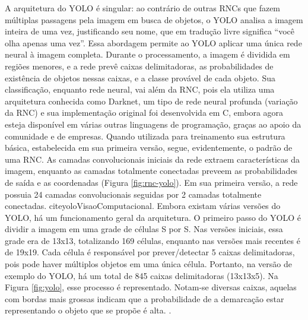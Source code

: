 A arquitetura do YOLO é singular: ao contrário de outras RNCs que fazem múltiplas passagens pela imagem em busca de objetos, o YOLO analisa a imagem inteira de uma vez, justificando seu nome, que em tradução livre significa “você olha apenas uma vez”. Essa abordagem permite ao YOLO aplicar uma única rede neural à imagem completa. Durante o processamento, a imagem é dividida em regiões menores, e a rede prevê caixas delimitadoras, as probabilidades de existência de objetos nessas caixas, e a classe provável de cada objeto. Sua classificação, enquanto rede neural, vai além da RNC, pois ela utiliza uma arquitetura conhecida como Darknet, um tipo de rede neural profunda (variação da RNC) e sua implementação original foi desenvolvida em C, embora agora esteja disponível em várias outras linguagens de programação, graças ao apoio da comunidade e de empresas. Quando utilizada para treinamento sua estrutura básica, estabelecida em sua primeira versão, segue, evidentemente, o padrão de uma RNC. As camadas convolucionais iniciais da rede extraem características da imagem, enquanto as camadas totalmente conectadas preveem as probabilidades de saída e as coordenadas (Figura \ref{fig:rnc-yolo}). Em sua primeira versão, a rede possuia 24 camadas convolucionais seguidas por 2 camadas totalmente conectadas. cite{yoloVisaoComputacional}.
Embora existam várias versões do YOLO, há um funcionamento geral da arquitetura. O primeiro passo do YOLO é dividir a imagem em uma grade de células S por S. Nas versões iniciais, essa grade era de 13x13, totalizando 169 células, enquanto nas versões mais recentes é de 19x19. Cada célula é responsável por prever/detectar 5 caixas delimitadoras, pois pode haver múltiplos objetos em uma única célula. Portanto, na versão de exemplo do YOLO, há um total de 845 caixas delimitadoras (13x13x5). Na Figura \ref{fig:yolo}, esse processo é representado. Notam-se diversas caixas, aquelas com bordas mais grossas indicam que a probabilidade de a demarcação estar representando o objeto que se propõe é alta. \cite{jiang2022review}.

